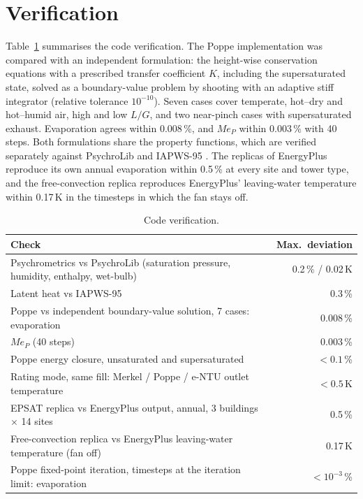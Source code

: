 \documentclass[preprint,12pt]{elsarticle}
\begin{document}
\section{Verification}\label{sec:verification}
Table~\ref{tab:verification} summarises the code verification. The Poppe implementation was compared with an
independent formulation: the height-wise conservation equations with a prescribed transfer coefficient $K$, including the
supersaturated state, solved as a boundary-value problem by shooting with an adaptive stiff integrator (relative
tolerance $10^{-10}$). Seven cases cover temperate, hot--dry and hot--humid air, high and low $L/G$, and two near-pinch
cases with supersaturated exhaust. Evaporation agrees within 0.008\,\%, and $Me_P$ within 0.003\,\% with 40 steps.
Both formulations share the property functions, which are verified separately against PsychroLib
\citep{meyer2019psychrolib} and IAPWS-95 \citep{wagner2002iapws}. The replicas of EnergyPlus reproduce its own annual
evaporation within 0.5\,\% at every site and tower type, and the free-convection replica reproduces EnergyPlus'
leaving-water temperature within 0.17\,K in the timesteps in which the fan stays off.

\begin{table}[t]\centering\small
\caption{Code verification.}\label{tab:verification}
\begin{tabular}{lr}\toprule
Check & Max.\ deviation \\\midrule
Psychrometrics vs PsychroLib (saturation pressure, humidity, enthalpy, wet-bulb) & 0.2\,\% / 0.02\,K \\
Latent heat vs IAPWS-95 & 0.3\,\% \\
Poppe vs independent boundary-value solution, 7 cases: evaporation & 0.008\,\% \\
\hspace{1em} $Me_P$ (40 steps) & 0.003\,\% \\
Poppe energy closure, unsaturated and supersaturated & $<0.1$\,\% \\
Rating mode, same fill: Merkel / Poppe / e-NTU outlet temperature & $<0.5$\,K \\
EPSAT replica vs EnergyPlus output, annual, 3 buildings $\times$ 14 sites & 0.5\,\% \\
Free-convection replica vs EnergyPlus leaving-water temperature (fan off) & 0.17\,K \\
Poppe fixed-point iteration, timesteps at the iteration limit: evaporation & $<10^{-3}$\,\% \\\bottomrule
\end{tabular}
\end{table}
\end{document}
